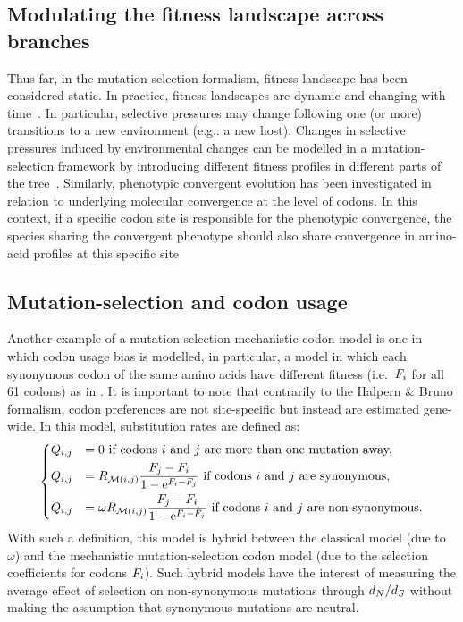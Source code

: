 \subsection{Modulating the fitness landscape across branches}
\label{subsec:modulating-the-fitness-landscape-across-branches}

Thus far, in the mutation-selection formalism, fitness landscape has been considered static.
In practice, fitness landscapes are dynamic and changing with time~\citep{Naumenko2012, Bazykin2015}.
In particular, selective pressures may change following one (or more) transitions to a new environment (e.g.: a new host).
Changes in selective pressures induced by environmental changes can be modelled in a mutation-selection framework by introducing different fitness profiles in different parts of the tree~\citep{Tamuri2009}.
Similarly, phenotypic convergent evolution has been investigated in relation to underlying molecular convergence at the level of codons.
In this context, if a specific codon site is responsible for the phenotypic convergence, the species sharing the convergent phenotype should also share convergence in amino-acid profiles at this specific site~\citep{Parto2017,Parto2018}

\subsection{Mutation-selection and codon usage}
\label{subsec:model-codon-usage}

Another example of a mutation-selection mechanistic codon model is one in which codon usage bias is modelled, in particular, a model in which each synonymous codon of the same amino acids have different fitness (i.e.~$F_{{i}}$ for all 61 codons) as in \citet{Yang2008}.
It is important to note that contrarily to the Halpern \& Bruno formalism, codon preferences are not site-specific but instead are estimated gene-wide.
In this model, substitution rates are defined as:
\begin{equation}
    \begin{dcases}
        Q_{{i}, {j}} & = 0 \text{ if codons ${i}$ and ${j}$ are more than one mutation away,} \\
        Q_{{i}, {j}} & = R_{\mathcal{M}({i}, {j})} \dfrac{F_{{j}} - F_{{i}}}{1 - \text{e}^{F_{{i}} - F_{{j}}} }\text{ if codons ${i}$ and ${j}$ are synonymous,} \\
        Q_{{i}, {j}} & = \omega R_{\mathcal{M}({i}, {j})} \dfrac{F_{{j}} - F_{{i}}}{1 - \text{e}^{F_{{i}} - F_{{j}}} } \text{ if codons ${i}$ and ${j}$ are non-synonymous}.
    \end{dcases}
    \label{eq:yang-codon-models}
\end{equation}
With such a definition, this model is hybrid between the classical model (due to $\omega$) and the mechanistic mutation-selection codon model (due to the selection coefficients for codons $F_{{i}}$).
Such hybrid models have the interest of measuring the average effect of selection on non-synonymous mutations through $d_N / d_S$ without making the assumption that synonymous mutations are neutral.


